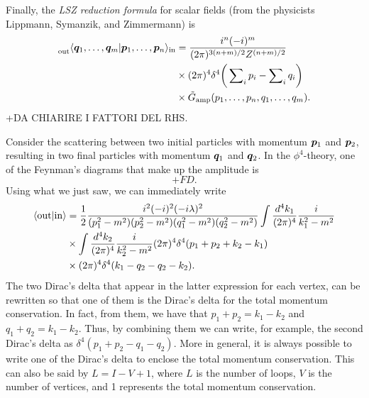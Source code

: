 Finally, the \emph{LSZ reduction formula} for scalar fields (from the physicists Lippmann, Symanzik, and Zimmermann) is 
\begin{equation}
    \begin{split}
        \prescript{}{\mathrm{out}}{\langle \bm{q}_1,\dots,\bm{q}_m | \bm{p}_1,\dots,\bm{p}_n \rangle}_{\mathrm{in}} &= \frac{i^n(-i)^m}{(2\pi)^{3(n + m)/2}Z^{(n + m)/2}} \\ 
        &\times (2\pi)^4\delta^4\bigg(\sum\nolimits_ip_i - \sum\nolimits_iq_i\bigg) \\
        &\times \tilde{G}_{\mathrm{amp}}(p_1,\dots,p_n,q_1,\dots,q_m).
    \end{split}
\end{equation}
+DA CHIARIRE I FATTORI DEL RHS. 
\begin{ex}
    Consider the scattering between two initial particles with momentum $\bm{p}_1$ and $\bm{p}_2$, resulting in two final particles with momentum $\bm{q}_1$ and $\bm{q}_2$. In the $\phi^4$-theory, one of the Feynman's diagrams that make up the amplitude is 
    \begin{equation}
        +FD.
    \end{equation}
    Using what we just saw, we can immediately write 
    \begin{equation}
        \begin{split}
            \langle \mathrm{out} | \mathrm{in} \rangle &= \frac{1}{2}\frac{i^2(-i)^2(-i\lambda)^2}{(p_1^2 - m^2)(p_2^2 - m^2)(q_1^2 - m^2)(q_2^2 - m^2)}\int\frac{d^4k_1}{(2\pi)^4}\frac{i}{k_1^2 - m^2} \\
            &\times \int\frac{d^4k_2}{(2\pi)^4}\frac{i}{k_2^2 - m^2}(2\pi)^4\delta^4(p_1 + p_2 + k_2 - k_1) \\
            &\times (2\pi)^4\delta^4(k_1 - q_2 - q_2 - k_2).
        \end{split}
    \end{equation}
    The two Dirac's delta that appear in the latter expression for each vertex, can be rewritten so that one of them is the Dirac's delta for the total momentum conservation. In fact, from them, we have that $p_1 + p_2 = k_1 - k_2$ and $q_1 + q_2 = k_1 - k_2$. Thus, by combining them we can write, for example, the second Dirac's delta as $\delta^4(p_1 + p_2 - q_1 - q_2)$. More in general, it is always possible to write one of the Dirac's delta to enclose the total momentum conservation. This can also be said by $L = I - V + 1$, where $L$ is the number of loops, $V$ is the number of vertices, and 1 represents the total momentum conservation.
\end{ex}
